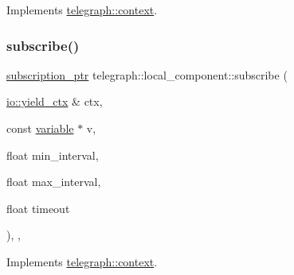 Implements \hyperlink{classtelegraph_1_1context_a8db167973f187f707a4108e112683969}{telegraph\+::context}.

\mbox{\label{classtelegraph_1_1local__component_a5a2282f1cf80dce32ed26e37c956d5c4}} 
\subsubsection{\texorpdfstring{subscribe()}{subscribe()}\hspace{0.1cm}{\footnotesize\ttfamily [2/2]}}
{\footnotesize\ttfamily \hyperlink{namespacetelegraph_a58641aa5b1a2cbdb0431916a87069f64}{subscription\+\_\+ptr} telegraph\+::local\+\_\+component\+::subscribe (\begin{DoxyParamCaption}\item[{\hyperlink{structboost_1_1asio_1_1yield__ctx}{io\+::yield\+\_\+ctx} \&}]{ctx,  }\item[{const \hyperlink{classtelegraph_1_1variable}{variable} $\ast$}]{v,  }\item[{float}]{min\+\_\+interval,  }\item[{float}]{max\+\_\+interval,  }\item[{float}]{timeout }\end{DoxyParamCaption})\hspace{0.3cm}{\ttfamily [inline]}, {\ttfamily [override]}, {\ttfamily [virtual]}}



Implements \hyperlink{classtelegraph_1_1context_aec3b3b0d7210a86f2ea2f5067ef8e922}{telegraph\+::context}.

\mbox{\label{classtelegraph_1_1local__component_ac546cfea4802ef3ca125c5dc183adf6c}} 
